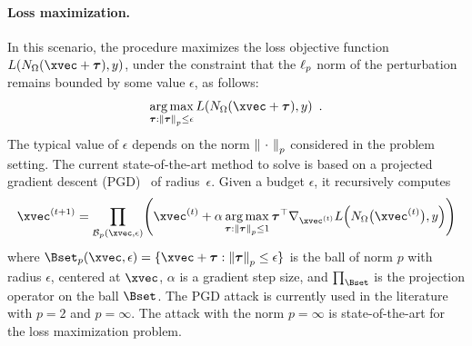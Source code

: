 \paragraph{Loss maximization.}
In this scenario, the procedure maximizes the loss objective function $L(\nn_\weights(\xvec + \adv), y)$, under the constraint that the $\ell_p $ norm of the perturbation remains bounded by some value $\epsilon$, as follows:
\begin{equation} \label{equation:ch2-lossmax}
  \argmax_{\adv:\norm{\adv}_p \leq \epsilon} L(\nn_\weights(\xvec + \adv), y) \enspace.
\end{equation}
The typical value of $\epsilon$ depends on the norm $\norm{\ \cdot\ }_p$ considered in the problem setting.
The current state-of-the-art method to solve  is based on a projected gradient descent (PGD)~\cite{madry2018towards} of radius~$\epsilon$.
Given a budget $\epsilon$, it recursively computes
\begin{equation} \label{equation:ch2-projectionPGD}
  \xvec^{(t+1)} = \prod_{\mathcal{B}_p(\xvec,\epsilon)}\left(\xvec^{(t)}
    + \alpha \argmax_{\adv: \norm{\adv}_p \leq 1} \adv^\top \nabla_{\xvec^{(t)}} L\left( \nn_\weights \big(\xvec^{(t)} \big), y \right)
\right)
\end{equation}
where $\Bset_p(\xvec,\epsilon) = \{ \xvec + \adv:\norm{\adv}_p \leq \epsilon\}$ is the ball of norm $p$ with radius $\epsilon$, centered at $\xvec$, $\alpha$ is a gradient step size, and $\prod_\Bset$ is the projection operator on the ball $\Bset$.
The PGD attack is currently used in the literature with $p=2$ and $p=\infty$.
The attack with the norm $p=\infty$ is state-of-the-art for the loss maximization problem.


